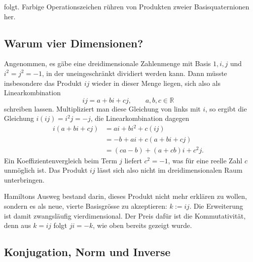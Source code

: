 folgt.
Farbige Operationszeichen rühren von Produkten zweier Basisquaternionen her.

\subsection{Warum vier Dimensionen?}
Angenommen, es gäbe eine dreidimensionale Zahlenmenge mit Basis $1, i, j$ und
$i^2 = j^2 = -1$, in der uneingeschränkt dividiert werden kann. Dann
müsste insbesondere das Produkt $i\!j$ wieder in dieser Menge liegen,
sich also als Linearkombination
\begin{equation*}
    i\!j = a + bi + cj, \qquad a,b,c \in \mathbb{R}
\end{equation*}
schreiben lassen. Multipliziert man diese Gleichung von links mit $i$,
so ergibt die Gleichung $i(i\!j) = i^2 j = -j$, die Linearkombination
dagegen
\begin{align*}
    i(a + bi + cj) &= ai + bi^2 + c(i\!j) \\
                   &= -b + ai + c(a + bi + cj) \\
                   &= (ca - b) + (a + cb)i + c^2\!j .
\end{align*}
Ein Koeffizientenvergleich beim Term $j$ liefert $c^2 = -1$, was für
eine reelle Zahl $c$ unmöglich ist. Das Produkt $i\!j$ lässt sich also
nicht im dreidimensionalen Raum unterbringen.

Hamiltons Ausweg bestand darin, dieses Produkt nicht mehr erklären zu
wollen, sondern es als neue, vierte Basisgrösse zu akzeptieren:
$k := i\!j$. Die Erweiterung ist damit zwangsläufig vierdimensional. Der
Preis dafür ist die Kommutativität, denn aus $k = i\!j$ folgt $ji = -k$,
wie oben bereits gezeigt wurde.

\subsection{Konjugation, Norm und Inverse}


